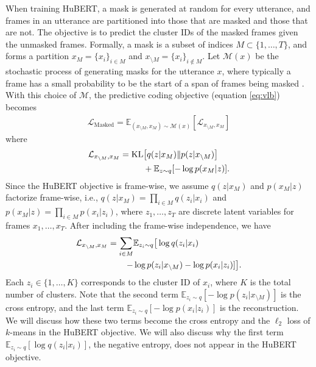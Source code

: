 \documentclass[11pt,a4paper]{article}
\newcommand{\KL}{\mathrm{KL}}
\begin{document}
When training HuBERT, a mask is generated at random for every utterance, and frames in an utterance are partitioned into those that are masked and those that are not.
The objective is to predict the cluster IDs of the masked frames given the unmasked frames.
Formally, a mask is a subset of indices $M \subset \{1,\dots,T\}$,
and forms a partition $x_M = \{x_i\}_{i \in M}$ and $x_{\setminus M} = \{x_i\}_{i \not\in M}$.
Let $\mathcal{M}(x)$ be the stochastic process of generating masks for the utterance $x$, where typically a frame has a small probability to be the start of a span of frames being masked \citep{baevski2020wav2vec}.
With this choice of $\mathcal{M}$, the predictive coding objective (equation \ref{eq:vlb}) becomes
\begin{align}
\mathcal{L}_{\text{Masked}} = \mathbb{E}_{(x_{\setminus M}, x_M) \sim \mathcal{M}(x)} [\mathcal{L}_{x_{\setminus M}, x_M}]
\end{align}
where
\begin{align}
\mathcal{L}_{x_{\setminus M}, x_M} = \KL & \big[q(z|x_M)\|p(z|x_{\setminus M})\big] \notag \\
  & + \mathbb{E}_{z \sim q}[-\log p(x_M | z)].
\end{align}
Since the HuBERT objective is frame-wise, we assume $q(z|x_M)$ and
$p(x_M | z)$ factorize frame-wise, i.e., $q(z|x_M) = \prod_{i \in M} q(z_i | x_i)$
and $p(x_M | z) = \prod_{i \in M} p(x_i | z_i)$,
where $z_1, \dots, z_T$ are discrete latent variables for frames $x_1, \dots, x_T$.
After including the frame-wise independence, we have
\begin{align}
\mathcal{L}_{x_{\setminus M}, x_M}
  = \sum_{i \in M} & \mathbb{E}_{z_i \sim q} \big[\log q(z_i|x_i) \label{eq:vlb-mlm} \\
   - &\log p(z_i|x_{\setminus M}) - \log p(x_i | z_i)] \big]. \notag
\end{align}
Each $z_i \in \{1, \dots, K\}$ corresponds to the cluster ID of $x_i$, where $K$ is the total number of clusters.
Note that the second term
$\mathbb{E}_{z_i \sim q}[-\log p(z_i | x_{\setminus M})]$
is the cross entropy, and the last term
$\mathbb{E}_{z_i \sim q}[-\log p(x_i | z_i)]$
is the reconstruction.
We will discuss how these two terms become the cross entropy
and the $\ell_2$ loss of $k$-means in the HuBERT objective.
We will also discuss why
the first term $\mathbb{E}_{z_i \sim q}[\log q(z_i | x_i)]$,
the negative entropy, does not appear in the HuBERT objective.
\end{document}
